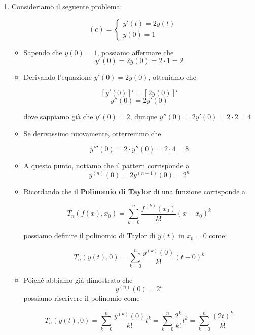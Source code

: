 \documentclass[a4paper, 12pt]{report}
\begin{document}
\begin{enumerate}
        \quad
        
        \item Consideriamo il seguente problema:
        
        $$
        (c) = \left \{ \begin{array}{l}
            y'(t) = 2y(t)  \\
            y(0) = 1 
        \end{array}\right .
        $$
        
        \begin{itemize}
            \item Sapendo che $y(0) = 1$, possiamo affermare che
            \[ y'(0) = 2y(0) = 2 \cdot 1 = 2\]
            
            \item Derivando l'equazione $y'(0) = 2y(0)$, otteniamo che
            
            \[ [y'(0)]' = [2y(0)]'\]
            \[ y''(0) = 2y'(0) \]
            
            dove sappiamo già che $y'(0) = 2$, dunque $ y''(0) = 2y'(0) = 2 \cdot 2 = 4$
            
            \item Se derivassimo nuovamente, otterremmo che
            
            \[ y'''(0) = 2 \cdot y''(0) = 2 \cdot 4 = 8\]
            
            \item A questo punto, notiamo che il pattern corrisponde a
            \[ y^{(n)}(0) = 2y^{(n-1)}(0) = 2^n\]
            
            \item Ricordando che il \textbf{Polinomio di Taylor} di una funzione corrisponde a
            
            \[ T_n(f(x), x_0) = \sum_{k=0}^{n} \frac{f^{(k)}(x_0)}{k!} (x-x_0)^k\]
            
            possiamo definire il polinomio di Taylor di $y(t)$ in $x_0 = 0$ come:
            
            \[ T_n(y(t), 0) = \sum_{k=0}^{n} \frac{y^{(k)}(0)}{k!} (t-0)^k \]
            
            \item Poiché abbiamo già dimostrato che
            \[ y^{(n)}(0) = 2^n\]
            possiamo riscrivere il polinomio come
            
            \[ T_n(y(t), 0) = \sum_{k=0}^{n} \frac{y^{(k)}(0)}{k!} t^k = \sum_{k=0}^{n} \frac{2^k}{k!} t^k =  \sum_{k=0}^{n} \frac{(2t)^k}{k!}\]
            

\end{itemize}
\end{enumerate}
\end{document}
